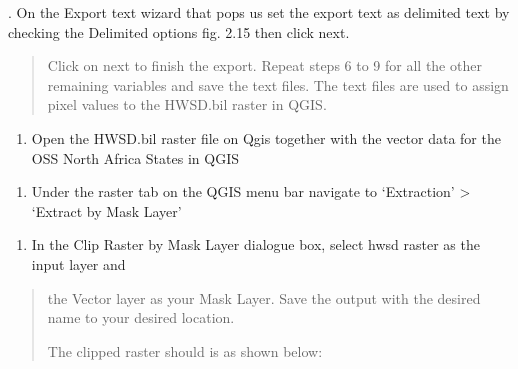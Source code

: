 \documentclass[letterpaper,10pt,english]{sphinxmanual}
\begin{document}
. On the Export text wizard that pops us set the export text as delimited text by checking
the Delimited options fig. 2.15 then click next.
\begin{quote}


\sphinxAtStartPar
Click on next to finish the export. Repeat steps 6 to 9 for all the other remaining variables
and save the text files. The text files are used to assign pixel values to the HWSD.bil raster in Q\sphinxhyphen{}GIS.
\end{quote}
\begin{enumerate}
%
\setcounter{enumi}{9}
\item {} 
\sphinxAtStartPar
Open the HWSD.bil raster file on Qgis together with the vector data for the OSS North Africa States in Q\sphinxhyphen{}GIS

\end{enumerate}
\begin{quote}

\end{quote}
\begin{enumerate}
%
\setcounter{enumi}{10}
\item {} 
\sphinxAtStartPar
Under the raster tab on the Q\sphinxhyphen{}GIS menu bar navigate to ‘Extraction’ \textgreater{} ‘Extract by Mask Layer’

\end{enumerate}
\begin{quote}

\end{quote}
\begin{enumerate}
%
\setcounter{enumi}{11}
\item {} 
\sphinxAtStartPar
In the Clip Raster by Mask Layer dialogue box, select hwsd raster as the input layer and

\end{enumerate}
\begin{quote}

\sphinxAtStartPar
the Vector layer as your Mask Layer. Save the output with the desired name to your desired location.


\sphinxAtStartPar
The clipped raster should is as shown below:

\end{quote}
\end{document}
